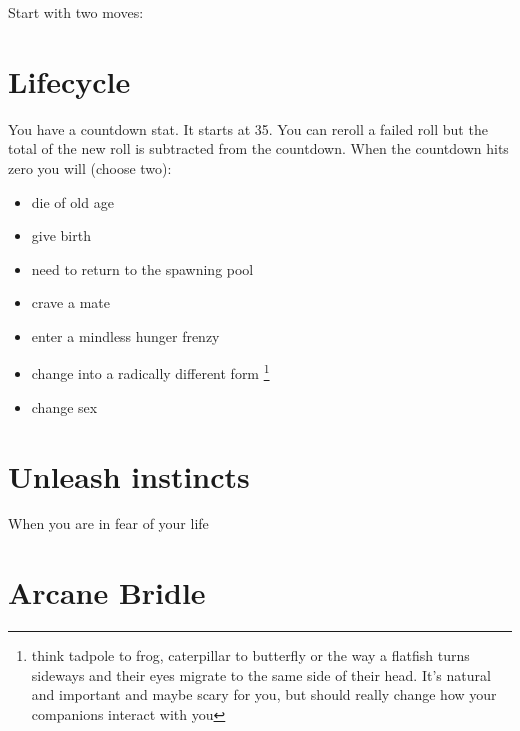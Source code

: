 \documentclass{tufte-book}
\begin{document}
Start with two moves:

\section{Lifecycle}
You have a countdown stat. It starts at 35. You can reroll a failed roll but the total of the new roll is subtracted from the countdown. When the countdown hits zero you will (choose two):
\begin{itemize}
\item die of old age
\item give birth
 \item need to return to the spawning pool 
\item crave a mate
\item enter a mindless hunger frenzy
\item change into a radically different form \footnote{think tadpole to frog, caterpillar to butterfly or the way a flatfish turns sideways and their eyes migrate to the same side of their head. It's natural and important and maybe scary for you, but should really change how your companions interact with you}
\item change sex
\end{itemize}

\section{Unleash instincts}
When you are in fear of your life 



\section{Arcane Bridle}
\end{document}
